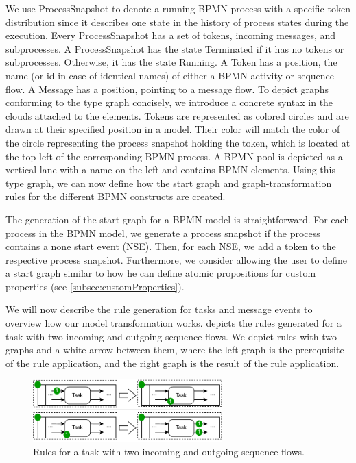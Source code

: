 \documentclass[submission, copyright, creativecommons]{eptcs}
\begin{document}
We use \textsf{ProcessSnapshot} to denote a running BPMN process with a specific token distribution since it describes one state in the history of process states during the execution.
Every \textsf{ProcessSnapshot} has a set of \textsf{tokens}, incoming \textsf{messages}, and \textsf{subprocesses}.
A \textsf{ProcessSnapshot} has the state \textsf{Terminated} if it has no \textsf{tokens} or \textsf{subprocesses}.
Otherwise, it has the state \textsf{Running}.
A \textsf{Token} has a \textsf{position}, the name (or id in case of identical names) of either a BPMN activity or sequence flow.
A \textsf{Message} has a \textsf{position}, pointing to a message flow.
To depict graphs conforming to the type graph concisely, we introduce a concrete syntax in the clouds attached to the elements.
Tokens are represented as colored circles and are drawn at their specified position in a model.
Their color will match the color of the circle representing the process snapshot holding the token, which is located at the top left of the corresponding BPMN process.
A BPMN pool is depicted as a vertical lane with a name on the left and contains BPMN elements.
Using this type graph, we can now define how the start graph and graph-transformation rules for the different BPMN constructs are created.

The generation of the start graph for a BPMN model is straightforward.
For each process in the BPMN model, we generate a process snapshot if the process contains a none start event (NSE).
Then, for each NSE, we add a token to the respective process snapshot.
Furthermore, we consider allowing the user to define a start graph similar to how he can define atomic propositions for custom properties (see \cref{subsec:customProperties}).

We will now describe the rule generation for tasks and message events to overview how our model transformation works.
 depicts the rules generated for a task with two incoming and outgoing sequence flows.
We depict rules with two graphs and a white arrow between them, where the left graph is the prerequisite of the rule application, and the right graph is the result of the rule application.
\begin{figure}[h]
    \centering
    \includegraphics[width=0.65\textwidth]{images/bpmn_semantics-task-rules.pdf}
    \caption{Rules for a task with two incoming and outgoing sequence flows.}
    \label{fig:taskRules}
\end{figure}
\end{document}
